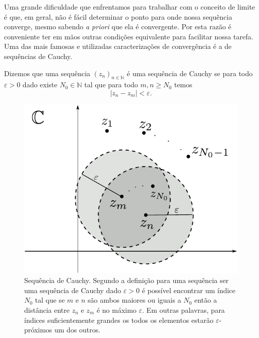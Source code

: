 
Uma grande dificuldade que enfrentamos para trabalhar com o conceito de limite é que, em geral,
não é fácil determinar o ponto para onde nossa sequência converge, mesmo sabendo \textit{a priori} que ela é 
convergente. Por esta razão é conveniente ter em mãos outras condições equivalente para facilitar nossa
tarefa. Uma das mais famosas e utilizadas caracterizações de convergência é a 
de sequências de Cauchy. 

\begin{definicao}\label{def-seq-Cauchy}
Dizemos que uma sequência $(z_n)_{n\in\mathbb{N}}$ é uma sequência de Cauchy se 
para todo $\varepsilon>0$ dado existe $N_0\in\mathbb{N}$ tal que para todo $m,n\geqslant N_0$
temos 
\[
|z_n-z_m|<\varepsilon.
\]
\end{definicao}
\begin{figure}[H]
\centering
\includegraphics[scale=0.6]{Figuras/fig-sequencia-Cauchy-2}
\caption{Sequência de Cauchy. Segundo a definição para uma sequência ser uma sequência de Cauchy dado $\varepsilon>0$
é possível encontrar um índice $N_0$ tal que se $m$ e $n$ são ambos maiores ou iguais a $N_0$ então 
a distância entre $z_n$ e $z_m$ é no máximo $\varepsilon$. Em outras palavras, para índices suficientemente
grandes os todos os elementos estarão $\varepsilon$-próximos um dos outros.}
\label{fig:fig-sequencia-cauchy}
\end{figure}


